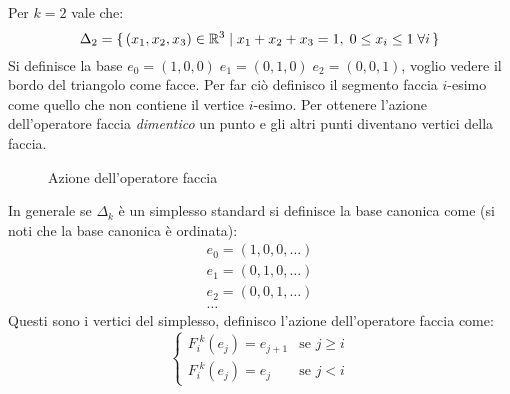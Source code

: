 \begin{example}[$ k = 2 $]
  Per $ k = 2 $ vale che:
  \[
    \Delta_2 = \set{ (x_1,x_2,x_3) \in \mathbb{R}^{3} | x_1 + x_2 + x_3 = 1, \; 0 \leq x_i \leq 1 \; \forall i}
  \]
  Si definisce la base $ e_0 = (1,0,0) \; e_1 = (0,1,0) \; e_2 = (0,0,1) $,
  voglio vedere il bordo del triangolo come facce. Per far ciò definisco il
  segmento faccia $ i $-esimo come quello che non contiene il vertice
  $ i $-esimo. Per ottenere l'azione dell'operatore faccia \emph{dimentico} un
  punto e gli altri punti diventano vertici della faccia.

  \begin{figure}[htbp]
    \centering
    \caption{Azione dell'operatore faccia}
    \label{fig:lez1:standard_simplex_faces}
  \end{figure}
\end{example}
In generale se $ \Delta_k $ è un simplesso standard si definisce la base canonica come (si noti
che la base canonica è ordinata):
\begin{gather*}
  e_0 = (1,0,0,\dots)                            \\
  e_1 = (0,1,0,\dots)                            \\
  e_2 = (0,0,1,\dots)                            \\
  \dots
\end{gather*}
Questi sono i vertici del simplesso, definisco l'azione dell'operatore faccia
come:
\[
  \begin{cases}
    F_i^{\; k}(e_j) = e_{j+1}     & \text{se } j \geq i \\
    F_i^{\; k}(e_j) = e_{j} & \text{se } j < i
  \end{cases}
\]

